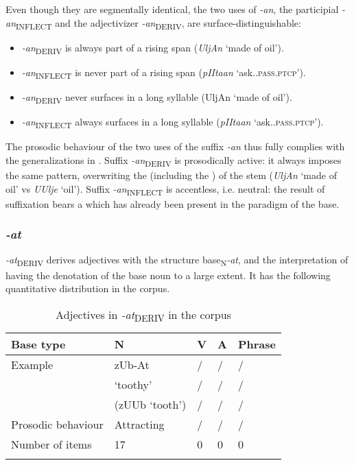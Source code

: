 \documentclass[output=paper, colorlinks, citecolor=brown, newtxmath]{langsci/langscibook}
\begin{document}
\largerpage
Even though they are segmentally identical, the two uses of \textit{-an}, the participial \textit{-an}\textsubscript{INFLECT} and the  adjectivizer \textit{-an}\textsubscript{DERIV}, are surface-distinguishable:
\begin{itemize}
  \item
\textit{-an}\textsubscript{DERIV} is always part of a rising span (\textit{UljAn} `made of oil').
\item
\textit{-an}\textsubscript{INFLECT} is never part of a rising span (\textit{pIItaan }`ask.\textsc{.pass.ptcp}').
\item \textit{-an}\textsubscript{DERIV} never surfaces in a long syllable ({UljAn} `made of oil').
\item  \textit{-an}\textsubscript{INFLECT} always surfaces in a long syllable (\textit{pIItaan }`ask.\textsc{.pass.ptcp}').
\end{itemize}

The prosodic behaviour of the two uses of the suffix \textit{-an} thus fully complies with the generalizations in . Suffix \textit{-an}\textsubscript{DERIV} is prosodically active: it always imposes the same pattern, overwriting the  (including the ) of the stem (\textit{UljAn} `made of oil' vs \textit{UUlje} `oil'). Suffix \textit{-an}\textsubscript{INFLECT} is accentless, i.e. neutral: the result of suffixation bears a  which has already been present in the paradigm of the base.

\subsubsection{\textit{-at}}\label{sec:simonovic:422}

\textit{-at}\textsubscript{DERIV} derives  adjectives with the structure base\textsubscript{N}\textit{-at}, and the interpretation of having the denotation of the base noun to a large extent. It has the following quantitative distribution in the corpus.

\begin{table}
\caption{Adjectives in \textit{-at}\textsubscript{DERIV} in the corpus}
\label{tab7}
 \begin{tabular}{ l l l l l}
\lsptoprule
 Base type & N & V & A & Phrase\\
\midrule
Example  &  zUb-At & / & /  & /   \\
  & `toothy' & / & / & / \\
& (zUUb `tooth') & / & / & / \smallskip	\\
Prosodic behaviour & Attracting & / & / & /\smallskip \\
Number of items & 17 & 0 & 0 & 0 \\
 \lspbottomrule
 \end{tabular}
\end{table}
\end{document}
